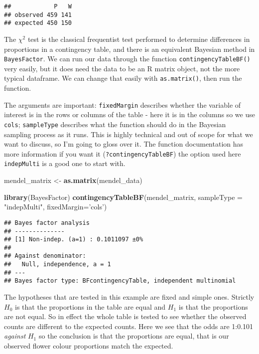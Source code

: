 \documentclass[
]{book}
\newenvironment{Shaded}{\begin{snugshade}}{\end{snugshade}}
\newcommand{\DataTypeTok}[1]{\textcolor[rgb]{0.13,0.29,0.53}{#1}}
\newcommand{\KeywordTok}[1]{\textcolor[rgb]{0.13,0.29,0.53}{\textbf{#1}}}
\newcommand{\NormalTok}[1]{#1}
\newcommand{\StringTok}[1]{\textcolor[rgb]{0.31,0.60,0.02}{#1}}
\begin{document}
\begin{verbatim}
##            P   W
## observed 459 141
## expected 450 150
\end{verbatim}

The \(\chi^2\) test is the classical frequentist test performed to determine differences in proportions in a contingency table, and there is an equivalent Bayesian method in \texttt{BayesFactor}. We can run our data through the function \texttt{contingencyTableBF()} very easily, but it does need the data to be an R matrix object, not the more typical dataframe. We can change that easily with \texttt{as.matrix()}, then run the function.

The arguments are important: \texttt{fixedMargin} describes whether the variable of interest is in the rows or columns of the table - here it is in the columns so we use \texttt{cols}; \texttt{sampleType} describes what the function should do in the Bayesian sampling process as it runs. This is highly technical and out of scope for what we want to discuss, so I'm going to gloss over it. The function documentation has more information if you want it (\texttt{?contingencyTableBF}) the option used here \texttt{indepMulti} is a good one to start with.

\begin{Shaded}
\begin{Highlighting}[]
\NormalTok{mendel_matrix <-}\StringTok{ }\KeywordTok{as.matrix}\NormalTok{(mendel_data)}

\KeywordTok{library}\NormalTok{(BayesFactor)}
\KeywordTok{contingencyTableBF}\NormalTok{(mendel_matrix, }\DataTypeTok{sampleType =} \StringTok{"indepMulti"}\NormalTok{, }\DataTypeTok{fixedMargin=}\StringTok{'cols'}\NormalTok{)}
\end{Highlighting}
\end{Shaded}

\begin{verbatim}
## Bayes factor analysis
## --------------
## [1] Non-indep. (a=1) : 0.1011097 ±0%
## 
## Against denominator:
##   Null, independence, a = 1 
## ---
## Bayes factor type: BFcontingencyTable, independent multinomial
\end{verbatim}

The hypotheses that are tested in this example are fixed and simple ones. Strictly \(H_0\) is that the proportions in the table are equal and \(H_1\) is that the proportions are not equal. So in effect the whole table is tested to see whether the observed counts are different to the expected counts. Here we see that the odds are 1:0.101 \emph{against} \(H_1\) so the conclusion is that the proportions are equal, that is our observed flower colour proportions match the expected.
\end{document}
